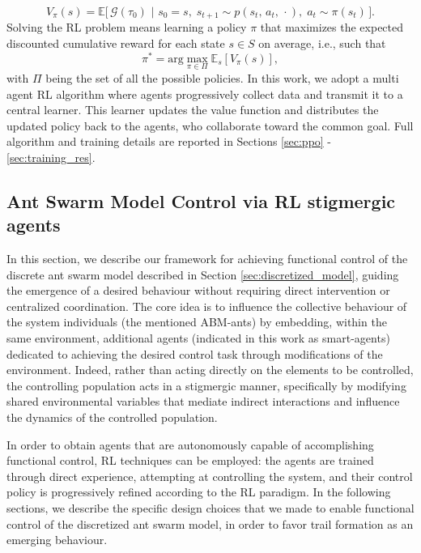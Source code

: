 \documentclass[openacc]{rsproca_new}%
\begin{document}
\begin{equation}
\label{eq:2.2}
     V_{\pi}(s) = \mathbb{E}\Big[ \,  \mathcal{G}(\tau_0) \,\, \vert \,\, s_0 = s ,\; s_{t+1} \sim p(s_t, \, a_t, \, \cdot ) ,\;  a_t \sim \pi(s_t) \, \Big].
\end{equation}
Solving the RL problem means learning a policy $\pi$ that maximizes the expected discounted cumulative reward for each state $s \in S$ on average, i.e., such that 
\begin{equation}
\pi^{*} = \text{arg}\max_{\pi \in \Pi} \mathbb{E}_{s}[V_{\pi}(s)],
\label{eq:RL-pb}
\end{equation}
with $\Pi$ being the set of all the possible policies.
In this work, we adopt a multi agent RL algorithm where agents progressively collect data and transmit it to a central learner. This learner updates the value function and distributes the updated policy back to the agents, who collaborate toward the common goal.
Full algorithm and training details are reported in Sections \ref{sec:ppo} - \ref{sec:training_res}.


\subsection{Ant Swarm Model Control via RL stigmergic agents}
\label{sec:RLDesign}
In this section, we describe our framework for achieving functional control of the discrete ant swarm model described in Section \ref{sec:discretized_model}, guiding the emergence of a desired behaviour without requiring direct intervention or centralized coordination. The core idea is to influence the collective behaviour of the system individuals (the mentioned ABM-ants) by embedding, within the same environment, additional agents (indicated in this work as smart-agents) dedicated to achieving the desired control task through modifications of the environment. Indeed, rather than acting directly on the elements to be controlled, the controlling population acts in a stigmergic manner, specifically by modifying shared environmental variables that mediate indirect interactions and influence the dynamics of the controlled population. 

In order to obtain agents that are autonomously capable of accomplishing functional control, RL techniques can be employed: the agents are trained through direct experience, attempting at controlling the system, and their control policy is progressively refined according to the RL paradigm. In the following sections, we describe the specific design choices that we made to enable functional control of the discretized ant swarm model, in order to favor trail formation as an emerging behaviour. 
\end{document}
